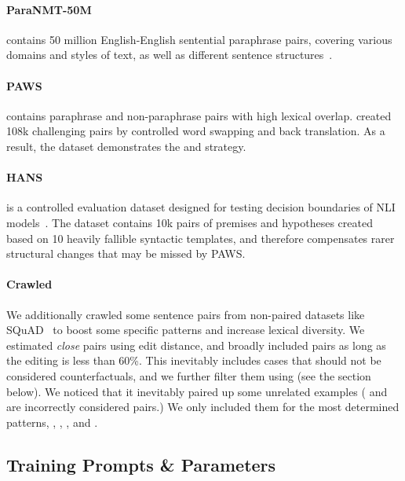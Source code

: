 \paragraph{ParaNMT-50M} contains 50 million English-English sentential paraphrase pairs, covering various domains and styles of text, as well as different sentence structures~\citet{wieting2017paranmt}. 

\paragraph{PAWS} contains paraphrase and non-paraphrase pairs with high lexical overlap. 
\citet{zhang2019paws} created 108k challenging pairs by controlled word swapping and back translation.
As a result, the dataset demonstrates the  and  strategy.


\paragraph{HANS} is a controlled evaluation dataset designed for testing decision boundaries of NLI models~\cite{mccoy2019right}. 
The dataset contains 10k pairs of premises and hypotheses created based on 10 heavily fallible syntactic templates, and therefore compensates rarer structural changes that may be missed by PAWS.


\paragraph{Crawled} 
We additionally crawled some sentence pairs from non-paired datasets like SQuAD~\cite{rajpurkar-etal-2016-squad} to boost some specific patterns and increase lexical diversity. 
We estimated \emph{close} pairs using edit distance, and broadly included pairs as long as the editing is less than 60\%.
This inevitably includes cases that should not be considered counterfactuals, and we further filter them using \tagstrs (see the section below).
We noticed that it inevitably paired up some unrelated examples (\eg {} and  are incorrectly considered  pairs.)
We only included them for the most determined patterns, \ie {}, , , and .


\subsection{Training Prompts \& Parameters}

